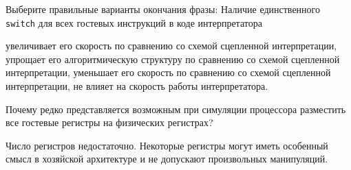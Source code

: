 \begin{questions}
\question[3] Выберите правильные варианты окончания фразы: Наличие единственного \texttt{switch} для всех гостевых инструкций в коде интерпретатора
\begin{choices}
    \choice увеличивает его скорость по сравнению со схемой сцепленной интерпретации,
    \choice упрощает его алгоритмическую структуру по сравнению со схемой сцепленной интерпретации,
    \correctchoice уменьшает его скорость по сравнению со схемой сцепленной интерпретации,
    \choice не влияет на скорость работы интерпретатора.
\end{choices}

\question[3] Почему редко представляется возможным при симуляции процессора разместить все гостевые регистры на физических регистрах?
\begin{solution}[2cm]
Число регистров недостаточно. Некоторые регистры могут иметь особенный смысл в хозяйской архитектуре и не допускают произвольных манипуляций.
\end{solution}

\end{questions}


% 
% 
% 
% 
% 
% 
% 
%         
% 


 
 